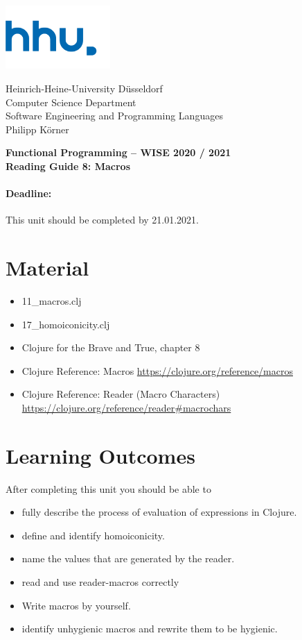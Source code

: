 \documentclass[11pt,a4paper]{article}
\begin{document}
\begin{minipage}[b]{\textwidth}
	\parbox[t]{5cm}{%
		\includegraphics[width=4cm]{unilogo}
		\hfill
	}
	\parbox[b]{11cm}{%
		Heinrich-Heine-University D\"usseldorf\\
		Computer Science Department\\
		Software Engineering and Programming Languages\\
		Philipp K\"orner
	}
\end{minipage}
\begin{center}
	\bf
	Functional Programming -- WISE 2020 / 2021\\
	Reading Guide 8: Macros
\end{center}

\pagestyle{empty}

\paragraph{Deadline:} This unit should be completed by 21.01.2021.

\section{Material} 

\begin{itemize}
    \item 11\_macros.clj
    \item 17\_homoiconicity.clj
	\item Clojure for the Brave and True, chapter 8
	\item Clojure Reference: Macros \url{https://clojure.org/reference/macros}
	\item Clojure Reference: Reader (Macro Characters) \url{https://clojure.org/reference/reader#macrochars}
\end{itemize}


\section{Learning Outcomes}

After completing this unit you should be able to

\begin{itemize}
	\item fully describe the process of evaluation of expressions in Clojure.
    \item define and identify homoiconicity.
    \item name the values that are generated by the reader.
    \item read and use reader-macros correctly
    \item Write macros by yourself.
    \item identify unhygienic macros and rewrite them to be hygienic.
\end{itemize}
\end{document}

